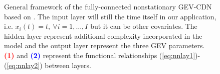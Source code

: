 \begin{figure}[!htb]
\begin{center}
{{
			}
		}
		\caption{General framework of the fully-connected nonstationary GEV-CDN based on \citet{cannon_flexible_2010}. The input layer will still the time itself in our application, i.e. $x_i(t)=t,  \ \forall i =1,\ldots,I$ but it can be other covariates. The hidden layer represent additional complexity incorporated in the model and the output layer represent the three GEV parameters. \textbf{\textcolor{red}{(1)}} and \textbf{\textcolor{blue}{(2)}} represent the functional relationships (\ref{eq:nnlay1})-(\ref{eq:nnlay2}) between layers. }\label{NN}
	\end{center}
\end{figure}


